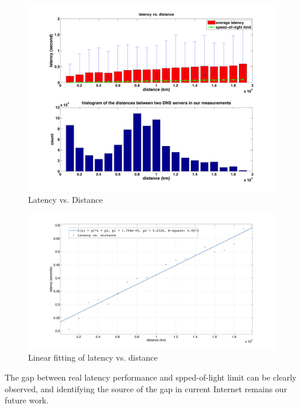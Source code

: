 \begin{figure}
  \centering
  \includegraphics[width=0.9\linewidth]{../figs/King_latency_dist.pdf}
  \vspace{-0.5em}
  \caption{Latency vs. Distance}
  \label{fig:latency_dist}
\end{figure}

\begin{figure}
  \centering
  \includegraphics[width=\linewidth]{../figs/fit_curve.pdf}
  \vspace{-1em}
  \caption{Linear fitting of latency vs. distance}
  \label{fig:fit_curve}
\end{figure}

The gap between real latency performance and spped-of-light limit can be clearly observed, and identifying the source of the gap in current Internet remains our future work. 


